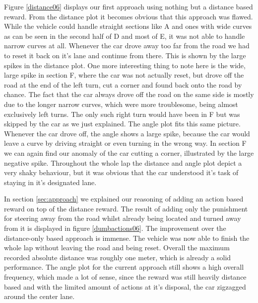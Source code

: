 Figure \ref{distance06} displays our first approach using nothing but a distance based reward. From the distance plot it becomes obvious that this approach was flawed. While the vehicle could handle straight sections like A and ones with wide curves as can be seen in the second half of D and most of E, it was not able to handle narrow curves at all. Whenever the car drove away too far from the road we had to reset it back on it's lane and continue from there. This is shown by the large spikes in the distance plot. One more interesting thing to note here is the wide, large spike in section F, where the car was not actually reset, but drove off the road at the end of the left turn, cut a corner and found back onto the road by chance. The fact that the car always drove off the road on the same side is mostly due to the longer narrow curves, which were more troublesome, being almost exclusively left turns. The only such right turn would have been in F but was skipped by the car as we just explained. 
The angle plot fits this same picture. Whenever the car drove off, the angle shows a large spike, because the car would leave a curve by driving straight or even turning in the wrong way. In section F we can again find our anomaly of the car cutting a corner, illustrated by the large negative spike.
Throughout the whole lap the distance and angle plot depict a very shaky behaviour, but it was obvious that the car understood it's task of staying in it's designated lane.

In section \ref{sec:approach} we explained our reasoning of adding an action based reward on top of the distance reward. The result of adding only the punishment for steering away from the road whilst already being located and turned away from it is displayed in figure \ref{dumbactions06}. The improvement over the distance-only based approach is immense. The vehicle was now able to finish the whole lap without leaving the road and being reset. Overall the maximum recorded absolute distance was roughly one meter, which is already a solid performance. The angle plot for the current approach still shows a high overall frequency, which made a lot of sense, since the reward was still heavily distance based and with the limited amount of actions at it's disposal, the car zigzagged around the center lane.

